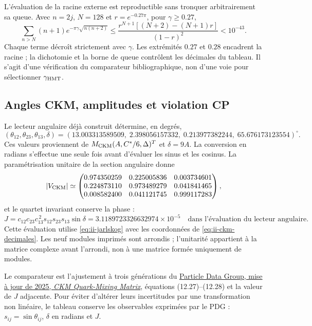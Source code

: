 L’évaluation de la racine externe est reproductible sans tronquer
arbitrairement sa queue. Avec \(n=2j\), \(N=128\) et
\(r=e^{-0.27\pi}\), pour \(\gamma\geq0.27\),
\[
 \sum_{n>N}(n+1)e^{-\pi\gamma\sqrt{n(n+2)}}
 \leq \frac{r^{N+1}[(N+2)-(N+1)r]}{(1-r)^2}<10^{-43}.
\]
Chaque terme décroît strictement avec \(\gamma\). Les extrémités
\(0.27\) et \(0.28\) encadrent la racine ; la dichotomie et la borne de queue
contrôlent les décimales du tableau. Il s’agit d’une vérification du
comparateur bibliographique, non d’une voie pour sélectionner \(\gamma_{\rm HMT}\).

\subsection{Angles CKM, amplitudes et violation CP}

Le lecteur angulaire déjà construit détermine, en degrés,
\begin{equation}
 (\theta_{12},\theta_{23},\theta_{13},\delta)
 =(13.003313589509,\;2.398056157332,\;
 0.213977382244,\;65.676173123554)^\circ.
 \label{eq:ii-ckm-decimales}
\end{equation}
Ces valeurs proviennent de \(M_{\rm CKM}(A,C^*/6,\Delta)^T\) et
\(\delta=9A\). La conversion en radians s’effectue une seule fois avant
d’évaluer les sinus et les cosinus. La paramétrisation unitaire de la section
angulaire donne
\[
 |V_{\rm CKM}|\simeq
 \begin{pmatrix}
 0.974350259&0.225005836&0.003734601\\
 0.224873110&0.973489279&0.041841465\\
 0.008582400&0.041121745&0.999117283
 \end{pmatrix},
\]
et le quartet invariant conserve la phase :
\[
 J=c_{12}c_{23}c_{13}^{\,2}s_{12}s_{23}s_{13}\sin\delta
 =3.1189723326632974\times10^{-5}\quad
 \text{dans l’évaluation du lecteur angulaire.}
\]
Cette évaluation utilise \eqref{eq:ii-jarlskog} avec les coordonnées de
\eqref{eq:ii-ckm-decimales}. Les neuf modules imprimés sont arrondis ; l’unitarité appartient
à la matrice complexe avant l’arrondi, non à une matrice formée
uniquement de modules.

Le comparateur est l’ajustement à trois générations du
\href{https://pdg.lbl.gov/2025/reviews/rpp2025-rev-ckm-matrix.pdf}
{Particle Data Group, mise à jour de 2025, \emph{CKM Quark-Mixing Matrix}},
équations (12.27)--(12.28) et la valeur de \(J\) adjacente. Pour éviter
d’altérer leurs incertitudes par une transformation non linéaire, le tableau
conserve les observables exprimées par le PDG : \(s_{ij}=\sin\theta_{ij}\),
\(\delta\) en radians et \(J\).

